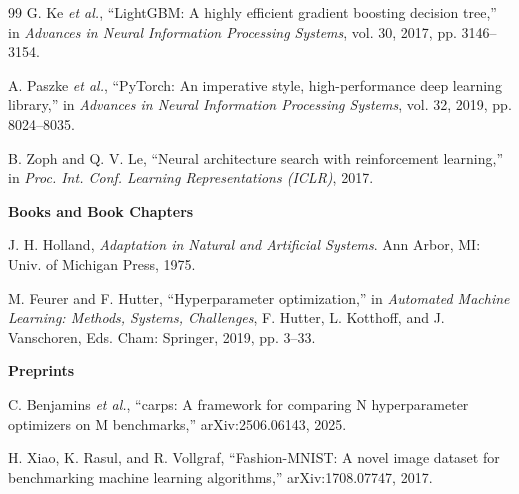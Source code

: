 \documentclass[11pt, a4paper]{article}
\begin{document}
\begin{thebibliography}{99}
 G. Ke \textit{et al.}, ``LightGBM: A highly efficient gradient boosting decision tree,'' in \textit{Advances in Neural Information Processing Systems}, vol. 30, 2017, pp. 3146--3154.

 A. Paszke \textit{et al.}, ``PyTorch: An imperative style, high-performance deep learning library,'' in \textit{Advances in Neural Information Processing Systems}, vol. 32, 2019, pp. 8024--8035.

 B. Zoph and Q. V. Le, ``Neural architecture search with reinforcement learning,'' in \textit{Proc. Int. Conf. Learning Representations (ICLR)}, 2017.

\item[] \textbf{Books and Book Chapters}

 J. H. Holland, \textit{Adaptation in Natural and Artificial Systems}. Ann Arbor, MI: Univ. of Michigan Press, 1975.

 M. Feurer and F. Hutter, ``Hyperparameter optimization,'' in \textit{Automated Machine Learning: Methods, Systems, Challenges}, F. Hutter, L. Kotthoff, and J. Vanschoren, Eds. Cham: Springer, 2019, pp. 3--33.

\item[] \textbf{Preprints}

 C. Benjamins \textit{et al.}, ``carps: A framework for comparing N hyperparameter optimizers on M benchmarks,'' arXiv:2506.06143, 2025.

 H. Xiao, K. Rasul, and R. Vollgraf, ``Fashion-MNIST: A novel image dataset for benchmarking machine learning algorithms,'' arXiv:1708.07747, 2017.

\end{thebibliography}
\end{document}
